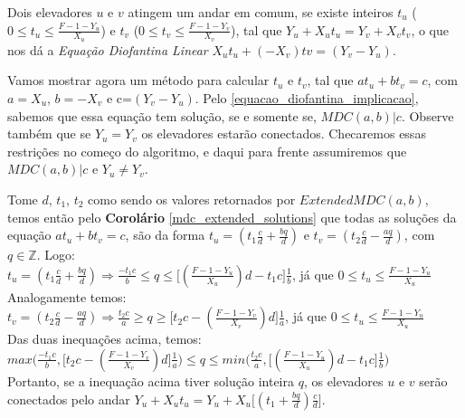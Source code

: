 Dois elevadores $u$ e $v$ atingem um andar em comum, se existe inteiros $t_u$ ($0\leq t_u\leq \frac{F-1-Y_u}{X_u}$) e $t_v$ ($0\leq t_v\leq \frac{F-1-Y_v}{X_v}$), tal que
$Y_u+X_ut_u = Y_v+X_vt_v$, o que nos dá a \textit{Equação Diofantina Linear} $X_ut_u + (-X_v)tv = (Y_v-Y_u)$.

Vamos mostrar agora um método para calcular $t_u$ e $t_v$, tal que $at_u + bt_v = c$, com $a=X_u$, $b=-X_v$ e c=$(Y_v-Y_u)$.
Pelo \autoref{equacao_diofantina_implicacao}, sabemos que essa equação tem solução, se e somente se, $MDC(a,b)|c$. Observe também que se $Y_u=Y_v$ os elevadores estarão conectados.
Checaremos essas restrições no começo do algoritmo, e daqui para frente assumiremos que $MDC(a,b)|c$ e $Y_u\neq Y_v$.

Tome $d$, $t_1$, $t_2$ como sendo os valores retornados por $ExtendedMDC(a,b)$, temos então pelo \textbf{Corolário} \autoref{mdc_extended_solutions} que todas as soluções da
equação $at_u + bt_v = c$, são da forma $t_u = (t_1\frac{c}{d} + \frac{bq}{d})$ e $t_v = (t_2\frac{c}{d} - \frac{aq}{d})$, com $q \in\mathbb{Z}$. Logo:
\\

$t_u = (t_1\frac{c}{d} + \frac{bq}{d}) \Rightarrow \frac{-t_1c}{b} \leq q \leq \big[(\frac{F-1-Y_u}{X_u})d - t_1c\big]\frac{1}{b}$, já que $0\leq t_u\leq \frac{F-1-Y_u}{X_u}$
\\

Analogamente temos:
\\

$t_v = (t_2\frac{c}{d} - \frac{aq}{d}) \Rightarrow \frac{t_2c}{a} \geq q \geq \big[t_2c - (\frac{F-1-Y_v}{X_v})d\big]\frac{1}{a}$, já que $0\leq t_u\leq \frac{F-1-Y_u}{X_u}$
\\

Das duas inequações acima, temos:
\\

$max\Big(\frac{-t_1c}{b}, \big[t_2c - (\frac{F-1-Y_v}{X_v})d\big]\frac{1}{a} \Big) \leq q \leq min\Big(\frac{t_2c}{a}, \big[(\frac{F-1-Y_u}{X_u})d - t_1c\big]\frac{1}{b}  \Big)$
\\

Portanto, se a inequação acima tiver solução inteira $q$, os elevadores $u$ e $v$ serão conectados pelo andar $Y_u+X_ut_u = Y_u+X_u\big[(t_1 + \frac{bq}{d})\frac{c}{d}\big]$.
\clearpage

